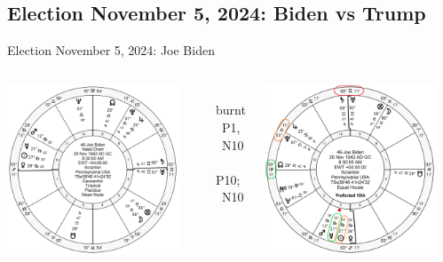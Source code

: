 \subsection{Election November 5, 2024: Biden vs Trump}
\begin{frame}[t]{Election November 5, 2024: Joe Biden}
\small

\begin{columns}[T, onlytextwidth]
\vspace{-1em}
{\includegraphics[width=0.9\textwidth]{charts/Biden.png}}
\fontsize{7pt}{8pt}\selectfont

\Mercury\, burnt \Sextile\, P1, \Sextile\, N10 \\
\Sun\, \Sextile\, P10; \Sextile\, N10

\vspace{-1em}
{\includegraphics[width=0.9\textwidth]{charts/Biden-Prof-10th.png}}
\fontsize{8pt}{9pt}\selectfont


\end{columns}
\end{frame}
